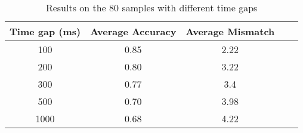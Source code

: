 \documentclass[letterpaper]{article}
\begin{document}
\begin{table}[h!]
\caption{Results on the 80 samples with different time gaps}\label{empiResults_2}
\centering
\begin{tabular}{c|c|c|c|c}
\hline
Time gap (ms) & Average Accuracy & Average Mismatch \\
\hline
100 & 0.85 & 2.22\\
200 & 0.80 & 3.22\\
300 & 0.77 & 3.4\\
500 & 0.70 & 3.98\\
1000 & 0.68 & 4.22\\
\hline
\end{tabular}
\end{table}
\end{document}
